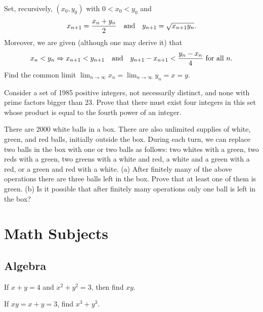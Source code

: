 \documentclass[12pt]{article}
\begin{document}
        \begin{exercise}
            Set, recursively, \((x_0,y_0)\) with \(0<x_0<y_0\) and
            \[x_{n+1}=\frac{x_n+y_n}{2}\quad\text{and}\quad y_{n+1}=\sqrt{x_{n+1}y_n}.\]
            Moreover, we are given (although one may derive it) that
            \[x_n<y_n\Rightarrow x_{n+1}<y_{n+1}\quad\text{and}\quad y_{n+1}-x_{n+1}<\frac{y_n-x_n}{4}\text{ for all }n.\]
            Find the common limit \(\displaystyle\lim_{n\to\infty}x_n=\lim_{n\to\infty}y_n=x=y\).
        \end{exercise}
    
        \begin{exercise}[IMO 1985]
            Consider a set of 1985 positive integers, not necessarily distinct, and none with prime factors bigger than 23. Prove that there must exist four integers in this set whose product is equal to the fourth power of an integer.
        \end{exercise}
    
        \begin{exercise}
            There are 2000 white balls in a box. There are also unlimited supplies of white, green, and red balls, initially outside the box. During each turn, we can replace two balls in the box with one or two balls as follows: two whites with a green, two reds with a green, two greens with a white and red, a white and a green with a red, or a green and red with a white. (a) After finitely many of the above operations there are three balls left in the box. Prove that at least one of them is green. (b) Is it possible that after finitely many operations only one ball is left in the box?
        \end{exercise}

\section{Math Subjects}

    \subsection{Algebra}

        \begin{exercise}
            If $x+y = 4$ and $x^2 + y^2 = 3$, then find $xy$.
        \end{exercise}

        \begin{exercise}
            If $xy=x+y = 3$, find $x^3+y^3$.
        \end{exercise}
\end{document}
